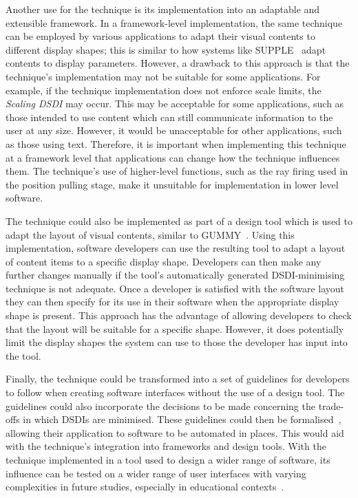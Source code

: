 \documentclass[twocolumn,compsoc]{cvm}
\begin{document}
{Another use for the technique is its implementation into an adaptable and extensible framework.
In a framework-level implementation, the same technique can be
employed by various applications to adapt their visual contents to different display shapes; this is similar to how systems like SUPPLE~\cite{Gajos2004} adapt contents to display parameters.
However, a drawback to this approach is that the technique's implementation may not be suitable for some applications.  
For example, if the technique implementation does not enforce scale limits, the {\emph{Scaling \ac{DSDI}}} may occur.
This may be acceptable for some applications, such as those intended to use content which can still communicate information to the user at any size.
However, it would be unacceptable for other applications, such as those using text.
Therefore, it is important when implementing this technique at a framework level that applications can change how the technique influences them.
The technique's use of higher-level functions, such as the ray firing used in the position pulling stage, make it unsuitable for implementation in lower level software.

The technique could also be implemented as part of a design tool which is used to adapt the layout of visual contents, similar to GUMMY~\cite{Meskens2008}.
Using this implementation, software developers can use the resulting tool to adapt a layout of content items to a specific display shape.
Developers can then make any further changes manually if the tool's automatically generated \ac{DSDI}-minimising technique is not adequate.
Once a developer is satisfied with the software layout they can then specify for its use in their software when the appropriate display shape is present.
This approach has the advantage of allowing developers to check that the layout will be suitable for a specific shape.
However, it does potentially limit the display shapes the system can use to those the developer has input into the tool.

Finally, the technique could be transformed into a set of guidelines for developers to follow when creating software interfaces without the use of a design tool.
The guidelines could also incorporate the decisions to be made concerning the trade-offs in which \acp{DSDI} are minimised.
These guidelines could then be formalised~\cite{Ngo2000}, allowing their application to software to be automated in places.
This would aid with the technique's integration into frameworks and design tools.
With the technique implemented in a tool used to design a wider range of software, its influence can be tested on a wider range of user interfaces with varying complexities in future studies, especially in educational contexts~\cite{McNaughton2017,jg-et-al:2017}.

}
\end{document}
